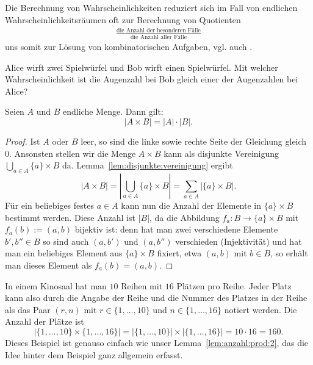 \begin{bem} 
	Die Berechnung von Wahrscheinlichkeiten reduziert sich im Fall von endlichen Wahrscheinlichkeitsräumen oft zur Berechnung von Quotienten 
	\begin{align*}
			\frac{\text{die Anzahl der besonderen Fälle}}{\text{die Anzahl aller Fälle}}
	\end{align*} 
	uns somit zur Lösung von kombinatorischen Aufgaben, vgl. auch \cite{Tit19}. 
\end{bem} 

\begin{aufg}
	Alice wirft zwei Spielwürfel und Bob wirft einen Spielwürfel. Mit welcher Wahrscheinlichkeit ist die Augenzahl bei Bob gleich einer der Augenzahlen bei Alice? 
\end{aufg} 

\begin{lem} \label{lem:anzahl:prod:2}
	Seien $A$ und $B$ endliche Menge. Dann gilt: 
	\[
		|A \times B| = |A| \cdot |B|. 
	\]
\end{lem}
\begin{proof} 
	Ist $A$ oder $B$ leer, so sind die linke sowie rechte Seite der Gleichung gleich $0$. Ansonsten stellen wir die Menge $A \times B$ kann als disjunkte Vereinigung $\bigcup_{a \in A} \{a\} \times B$ da. Lemma~\ref{lem:disjunkte:vereinigung} ergibt
	\[
		|A \times B| = \left| \bigcup_{a \in A} \{a \} \times B \right| = \sum_{a \in A} | \{a \} \times B |.
	\]
	Für ein beliebiges festes $a \in A$ kann nun die Anzahl der Elemente in $\{a\} \times B$ bestimmt werden. Diese Anzahl ist $|B|$, da die Abbildung $f_a : B \to \{a\} \times B$ mit $f_a(b) := (a,b)$ bijektiv ist: denn hat man zwei verschiedene Elemente $b',b'' \in B$ so sind auch $(a,b')$ und $(a,b'')$ verschieden (Injektivität) und hat man ein beliebiges Element aus $\{a\} \times B$ fixiert, etwa $(a,b)$ mit $b \in B$, so erhält man dieses Element als $f_a(b) = (a,b)$. 
\end{proof} 

\begin{bsp}
	In einem Kinosaal hat man $10$ Reihen mit $16$ Plätzen pro Reihe. Jeder Platz kann also durch die Angabe der Reihe und die Nummer des Platzes in der Reihe als das Paar $(r,n)$ mit $r \in \{1,\ldots,10\}$ und $n \in \{1,\ldots,16\}$ notiert werden. Die Anzahl der Plätze ist 
	\[
			| \{1,\ldots,10\} \times \{1,\ldots,16\} |  = | \{1,\ldots,10\} | \times | \{1,\ldots,16\}| = 10 \cdot 16 = 160. 
	\]
	Dieses Beispiel ist genauso einfach wie unser Lemma~\ref{lem:anzahl:prod:2}, das die Idee hinter dem Beispiel ganz allgemein erfasst. 
\end{bsp} 
 


